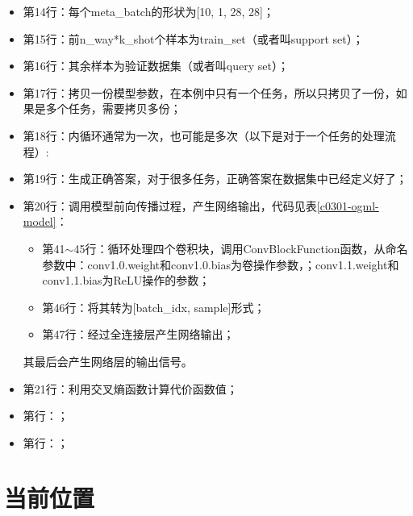 \begin{itemize}
\item 第14行：每个meta\_batch的形状为[10, 1, 28, 28]；
\item 第15行：前n\_way*k\_shot个样本为train\_set（或者叫support set）；
\item 第16行：其余样本为验证数据集（或者叫query set）；
\item 第17行：拷贝一份模型参数，在本例中只有一个任务，所以只拷贝了一份，如果是多个任务，需要拷贝多份；
\item 第18行：内循环通常为一次，也可能是多次（以下是对于一个任务的处理流程）:
\item 第19行：生成正确答案，对于很多任务，正确答案在数据集中已经定义好了；
\item 第20行：调用模型前向传播过程，产生网络输出，代码见表\ref{c0301-ogml-model}：
	\begin{itemize}
	\item 第41$\sim$45行：循环处理四个卷积块，调用ConvBlockFunction函数，从命名参数中：conv1.0.weight和conv1.0.bias为卷操作参数，；conv1.1.weight和conv1.1.bias为ReLU操作的参数；
	\item 第46行：将其转为[batch\_idx, sample]形式；
	\item 第47行：经过全连接层产生网络输出；
	\end{itemize}
	其最后会产生网络层的输出信号。
\item 第21行：利用交叉熵函数计算代价函数值；
\item 第行：；
\item 第行：；
\end{itemize}

















\section{当前位置}




